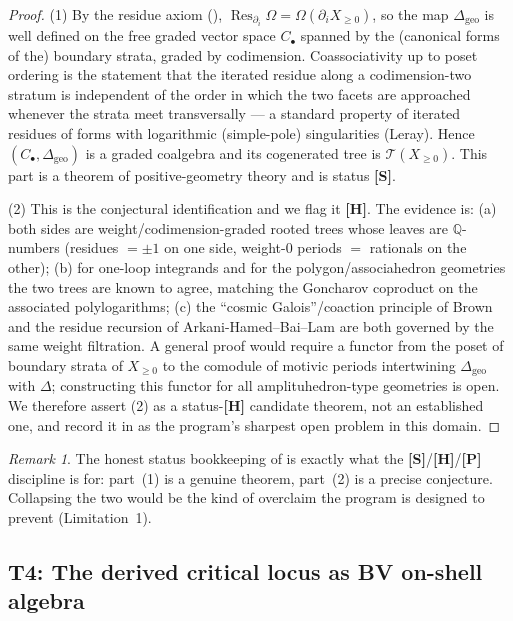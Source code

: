 \documentclass[12pt]{article}
\theoremstyle{definition}
\theoremstyle{remark}
\newtheorem{remark}[theorem]{Remark}
\newcommand{\Res}{\operatorname{Res}}
\newcommand{\QQ}{\mathbb{Q}}
\newcommand{\status}[1]{\textnormal{\textsf{\textbf{[#1]}}}}
\begin{document}
\begin{proof}
(1) By the residue axiom (), $\Res_{\partial_i}\Omega=\Omega(\partial_i X_{\ge 0})$,
so the map $\Delta_{\mathrm{geo}}$ is well defined on the free graded vector space $C_\bullet$ spanned by
the (canonical forms of the) boundary strata, graded by codimension. Coassociativity up to poset
ordering is the statement that the iterated residue along a codimension-two stratum is independent of the
order in which the two facets are approached whenever the strata meet transversally --- a standard
property of iterated residues of forms with logarithmic (simple-pole) singularities (Leray). Hence
$(C_\bullet,\Delta_{\mathrm{geo}})$ is a graded coalgebra and its cogenerated tree is $\mathcal T(X_{\ge
0})$. This part is a theorem of positive-geometry theory and is status \status{S}.

(2) This is the conjectural identification and we flag it \status{H}. The evidence is: (a) both sides are
weight/codimension-graded rooted trees whose leaves are $\QQ$-numbers (residues $=\pm1$ on one side,
weight-$0$ periods $=$ rationals on the other); (b) for one-loop integrands and for the polygon/associahedron
geometries the two trees are known to agree, matching the Goncharov coproduct on the associated
polylogarithms; (c) the ``cosmic Galois''/coaction principle of Brown and the residue recursion of
Arkani-Hamed--Bai--Lam are both governed by the same weight filtration. A general proof would require a
functor from the poset of boundary strata of $X_{\ge 0}$ to the comodule of motivic periods intertwining
$\Delta_{\mathrm{geo}}$ with $\Delta$; constructing this functor for all amplituhedron-type geometries is
open. We therefore assert (2) as a status-\status{H} candidate theorem, not an established one, and record
it in  as the program's sharpest open problem in this domain.
\end{proof}

\begin{remark}
The honest status bookkeeping of  is exactly what the \status{S}/\status{H}/\status{P}
discipline is for: part~(1) is a genuine theorem, part~(2) is a precise conjecture. Collapsing the two
would be the kind of overclaim the program is designed to prevent (Limitation~1).
\end{remark}

\subsection{T4: The derived critical locus as BV on-shell algebra}
\end{document}
